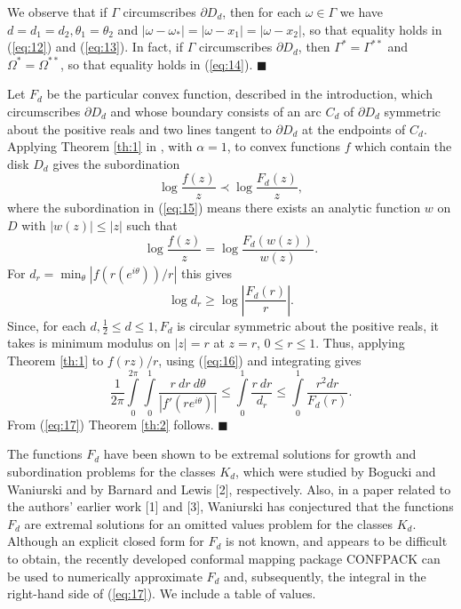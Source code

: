 We observe that if $\Gamma$ circumscribes $\partial D_d$, then for
each $\omega \in \Gamma$ we have $d=d_1 =d_2, \theta_1=\theta_2$ and
$|\omega-\omega_\ast|=|\omega-x_1|=|\omega-x_2|$, so that equality holds in
(\ref{eq:12}) and (\ref{eq:13}).  In fact, if $\Gamma$ circumscribes
$\partial D_d$, then $\Gamma^\ast=\Gamma^{\ast\ast}$ and $\Omega^\ast
=\Omega^{\ast\ast}$, so that equality holds in (\ref{eq:14}). \hfill
$\blacksquare$
\vspace{12pt}

\vspace{12pt}

Let $F_d$ be the particular convex function, described in the
introduction, which circumscribes $\partial D_d$ and whose boundary
consists of an arc $C_d$ of $\partial D_d$ symmetric about the
positive reals and two lines tangent to $\partial D_d$ at the
endpoints of $C_d$.  Applying Theorem \ref{th:1} in \cite{3}, with
$\alpha =1$, to convex functions $f$ which contain the disk $D_d$
gives the subordination 
\begin{equation}
\label{eq:15}
\log \frac{f(z)}{z} \prec \log \frac{F_d(z)}{z},
\end{equation}
where the subordination in (\ref{eq:15}) means there exists an
analytic function $w$ on $D$ with $|w(z)|\leq |z|$ such that 
$$ \log \frac{f(z)}{z} =\log \frac{F_d (w(z))}{w(z)}.$$
For $d_r=\displaystyle{\min_\theta} |f(r(e^{i\theta}))/r|$ this gives
\begin{equation}
\label{eq:16}
\log d_r \geq \log \left| \frac{F_d(r)}{r}\right|.
\end{equation}
Since, for each $d, \frac{1}{2} \leq d \leq 1, F_d$ is circular
symmetric about the positive reals, it takes is minimum modulus on
$|z|=r$ at $z=r$, $ 0\leq r\leq 1$.  Thus, applying Theorem
\ref{th:1} to $f(rz)/r$, using (\ref{eq:16}) and integrating gives
\begin{equation}
\label{eq:17}
\frac{1}{2\pi} \int\limits^{2\pi}_0 \int\limits^1_0 \frac{r\ dr\
d\theta}{|f' (re^{i\theta})|} \leq \int\limits^1_0 \frac{r\ dr}{d_r}
\leq \int\limits^1_0 \frac{r^2dr}{F_d(r)}.
\end{equation}
From 
(\ref{eq:17}) Theorem \ref{th:2} follows. \hfill $\blacksquare$
\vspace{12pt}

The functions $F_d$ have been shown to be extremal solutions for
growth and subordination problems for the classes $K_d$, which were
studied by Bogucki and Waniurski \cite{bog} and by Barnard and Lewis [2],
respectively.  Also, in a paper related to the authors' earlier work
[1] and [3], Waniurski \cite{wan} has conjectured that the functions $F_d$ are
extremal solutions for an omitted values problem for the classes $K_d$.
Although an explicit closed form for $F_d$ is not known, and appears
to be difficult to obtain,  the recently
developed conformal mapping package CONFPACK \cite{7} can be used to
numerically approximate $F_d$ and, subsequently, the integral in the
right-hand side of (\ref{eq:17}).  We include a table of values.

